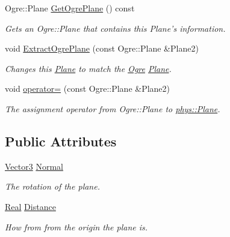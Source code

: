 \begin{DoxyCompactItemize}
Ogre::Plane \hyperlink{classphys_1_1Plane_abbdcdd8d6e7c0d8de92cabd250ff41dc}{GetOgrePlane} () const 
\begin{DoxyCompactList}\small\item\em Gets an Ogre::Plane that contains this Plane's information. \item\end{DoxyCompactList}\item 
void \hyperlink{classphys_1_1Plane_a84b2378666a0e1c791f4f72d8df52c84}{ExtractOgrePlane} (const Ogre::Plane \&Plane2)
\begin{DoxyCompactList}\small\item\em Changes this \hyperlink{classphys_1_1Plane}{Plane} to match the \hyperlink{namespaceOgre}{Ogre} \hyperlink{classphys_1_1Plane}{Plane}. \item\end{DoxyCompactList}\item 
void \hyperlink{classphys_1_1Plane_ac045b7b0aac024a5fe771786d0c433f7}{operator=} (const Ogre::Plane \&Plane2)
\begin{DoxyCompactList}\small\item\em The assignment operator from Ogre::Plane to \hyperlink{classphys_1_1Plane}{phys::Plane}. \item\end{DoxyCompactList}\end{DoxyCompactItemize}
\subsection*{Public Attributes}
\begin{DoxyCompactItemize}
\item 
\hypertarget{classphys_1_1Plane_ac54624aabcdede3d45e06dd869419c9f}{
\hyperlink{classphys_1_1Vector3}{Vector3} \hyperlink{classphys_1_1Plane_ac54624aabcdede3d45e06dd869419c9f}{Normal}}
\label{d1/d0c/classphys_1_1Plane_ac54624aabcdede3d45e06dd869419c9f}

\begin{DoxyCompactList}\small\item\em The rotation of the plane. \item\end{DoxyCompactList}\item 
\hypertarget{classphys_1_1Plane_ac352595324c4df7f8385c3ad7014e65c}{
\hyperlink{namespacephys_af7eb897198d265b8e868f45240230d5f}{Real} \hyperlink{classphys_1_1Plane_ac352595324c4df7f8385c3ad7014e65c}{Distance}}
\label{d1/d0c/classphys_1_1Plane_ac352595324c4df7f8385c3ad7014e65c}

\begin{DoxyCompactList}\small\item\em How from from the origin the plane is. \item\end{DoxyCompactList}\end{DoxyCompactItemize}


